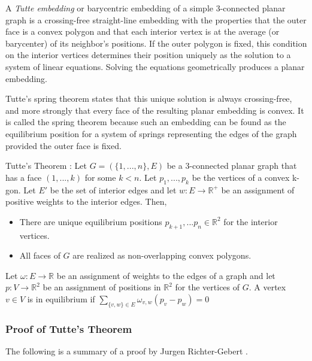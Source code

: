 \documentclass[11pt]{article}
\newcommand{\R}{\mathbb{R}}
\begin{document}
  A \emph{Tutte embedding} or barycentric embedding of a simple 3-connected planar graph is a crossing-free straight-line embedding with the properties that the outer face is a convex polygon and that each interior vertex is at the average (or barycenter) of its neighbor's positions. If the outer polygon is fixed, this condition on the interior vertices determines their position uniquely as the solution to a system of linear equations. Solving the equations geometrically produces a planar embedding. 
  
  Tutte's spring theorem states that this unique solution is always crossing-free, and more strongly that every face of the resulting planar embedding is convex. It is called the spring theorem because such an embedding can be found as the equilibrium position for a system of springs representing the edges of the graph provided the outer face is fixed.
 
 Tutte's Theorem \cite{realizationSpaces}: Let $G = (\{1,...,n\},E)$ be a 3-connected planar graph that has a face $(1,...,k)$ for some $k<n$. Let $p_1,...,p_k$ be the vertices of a convex k-gon. Let $E'$ be the set of interior edges and let $w : E \rightarrow \R^+$ be an assignment of positive weights to the interior edges. Then,
 	\begin{itemize}
		\item There are unique equilibrium positions $p_{k+1}, ...p_n \in \R^2$ for the interior vertices. 
		\item All faces of $G$ are realized as non-overlapping convex polygons.
	\end{itemize}
	
Let $\omega : E \rightarrow \R$ be an assignment of weights to the edges of a graph and let $p:V \rightarrow \R^2$ be an assignment of positions in $\R^2$ for the vertices of $G$. A vertex $v \in V$ is in equilibrium if  $\sum\limits_{\{v,w\} \in E} \omega_{v,w}(p_v - p_w) = 0$

\subsubsection{Proof of Tutte's Theorem}
The following is a summary of a proof by Jurgen Richter-Gebert \cite{realizationSpaces}.
\end{document}
